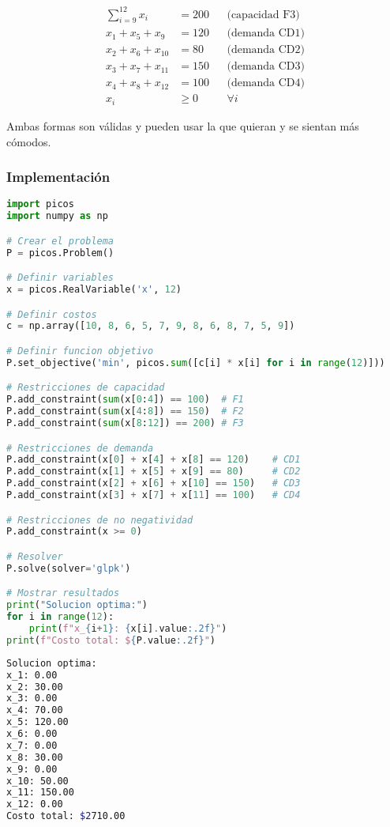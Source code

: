 \documentclass[12pt]{article}
\begin{document}
\begin{align*}
\sum_{i=9}^{12} x_{i} &= 200 && \text{(capacidad F3)} \\
x_1 + x_5 + x_9 &= 120 && \text{(demanda CD1)} \\
x_2 + x_6 + x_{10} &= 80 && \text{(demanda CD2)} \\
x_3 + x_7 + x_{11} &= 150 && \text{(demanda CD3)} \\
x_4 + x_8 + x_{12} &= 100 && \text{(demanda CD4)} \\
x_{i} &\geq 0 && \forall i
\end{align*}

Ambas formas son válidas y pueden usar la que quieran y se sientan más cómodos.

\subsubsection{Implementación}

\begin{lstlisting}[language=Python]
import picos
import numpy as np

# Crear el problema
P = picos.Problem()

# Definir variables
x = picos.RealVariable('x', 12)

# Definir costos
c = np.array([10, 8, 6, 5, 7, 9, 8, 6, 8, 7, 5, 9])

# Definir funcion objetivo
P.set_objective('min', picos.sum([c[i] * x[i] for i in range(12)]))

# Restricciones de capacidad
P.add_constraint(sum(x[0:4]) == 100)  # F1
P.add_constraint(sum(x[4:8]) == 150)  # F2
P.add_constraint(sum(x[8:12]) == 200) # F3

# Restricciones de demanda
P.add_constraint(x[0] + x[4] + x[8] == 120)    # CD1
P.add_constraint(x[1] + x[5] + x[9] == 80)     # CD2
P.add_constraint(x[2] + x[6] + x[10] == 150)   # CD3
P.add_constraint(x[3] + x[7] + x[11] == 100)   # CD4

# Restricciones de no negatividad
P.add_constraint(x >= 0)

# Resolver
P.solve(solver='glpk')

# Mostrar resultados
print("Solucion optima:")
for i in range(12):
    print(f"x_{i+1}: {x[i].value:.2f}")
print(f"Costo total: ${P.value:.2f}")
\end{lstlisting}

\begin{lstlisting}[language=bash,backgroundcolor=\color{black},basicstyle=\color{white}\ttfamily,numbers=none]
Solucion optima:
x_1: 0.00
x_2: 30.00
x_3: 0.00
x_4: 70.00
x_5: 120.00
x_6: 0.00
x_7: 0.00
x_8: 30.00
x_9: 0.00
x_10: 50.00
x_11: 150.00
x_12: 0.00
Costo total: $2710.00
\end{lstlisting}
\end{document}
